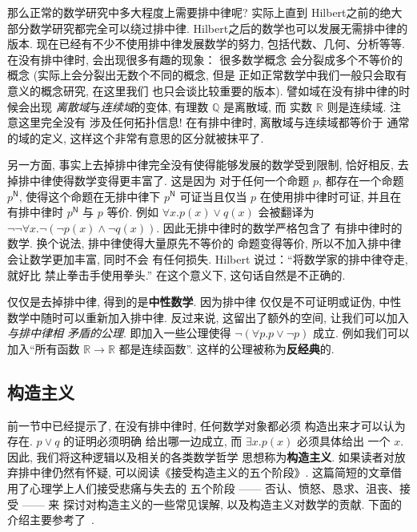 \documentclass[UTF8]{ctexbook}
\newcommand{\cons}[1]{\textsf{#1}}
\theoremstyle{plain}
\theoremstyle{definition}
\theoremstyle{remark}
\begin{document}
那么正常的数学研究中多大程度上需要排中律呢? 实际上直到
Hilbert之前的绝大部分数学研究都完全可以绕过排中律.
Hilbert之后的数学也可以发展无需排中律的版本.
现在已经有不少不使用排中律发展数学的努力,
包括代数、几何、分析等等. 在没有排中律时,
会出现很多有趣的现象： 很多数学概念
会分裂成多个不等价的概念 (实际上会分裂出无数个不同的概念, 但是
正如正常数学中我们一般只会取有意义的概念研究, 在这里我们
也只会谈比较重要的版本). 譬如域在没有排中律的时候会出现%
\emph{离散域}与\emph{连续域}的变体, 有理数
\(\mathbb Q\) 是离散域, 而
实数 \(\mathbb R\) 则是连续域. 注意这里完全没有
涉及任何拓扑信息! 在有排中律时, 离散域与连续域都等价于
通常的域的定义, 这样这个非常有意思的区分就被抹平了.

另一方面, 事实上去掉排中律完全没有使得能够发展的数学受到限制,
恰好相反, 去掉排中律使得数学变得更丰富了. 这是因为
对于任何一个命题 \(p\), 都存在一个命题 \(p^{\cons{N}}\),
使得这个命题在无排中律下 \(p^{\cons{N}}\) 可证当且仅当
\(p\) 在使用排中律时可证, 并且在有排中律时 \(p^{\cons{N}}\)
与 \(p\) 等价. 例如 \(\forall x. p(x) \vee q(x)\)
会被翻译为 \(\neg \neg \forall x. \neg (\neg p(x) \wedge \neg q(x))\).
因此无排中律时的数学严格包含了
有排中律时的数学. 换个说法, 排中律使得大量原先不等价的
命题变得等价, 所以不加入排中律会让数学更加丰富, 同时不会
有任何损失. Hilbert 说过：“将数学家的排中律夺走, 就好比
禁止拳击手使用拳头.” 在这个意义下, 这句话自然是不正确的.

仅仅是去掉排中律, 得到的是\textbf{中性数学}. 因为排中律
仅仅是不可证明或证伪, 中性数学中随时可以重新加入排中律.
反过来说, 这留出了额外的空间, 让我们可以加入\emph{与排中律相
矛盾的公理}. 即加入一些公理使得 \(\neg (\forall p. p \vee \neg p)\)
成立. 例如我们可以加入“所有函数 \(\mathbb R \to \mathbb R\)
都是连续函数”. 这样的公理被称为\textbf{反经典}的.

\subsection{构造主义}

前一节中已经提示了, 在没有排中律时, 任何数学对象都必须
构造出来才可以认为存在. \(p \vee q\) 的证明必须明确
给出哪一边成立, 而 \(\exists x. p(x)\) 必须具体给出
一个 \(x\). 因此, 我们将这种逻辑以及相关的各类数学哲学
思想称为\textbf{构造主义}. 如果读者对放弃排中律仍然有怀疑,
可以阅读《接受构造主义的五个阶段》\cite{bauer:2016:fivestage}.
这篇简短的文章借用了心理学上人们接受悲痛与失去的
五个阶段 ------ 否认、愤怒、恳求、沮丧、接受 ------ 来
探讨对构造主义的一些常见误解, 以及构造主义对数学的贡献.
下面的介绍主要参考了~\cites{carl:1998:brouwer}{sep:2022:constructive}.
\end{document}
